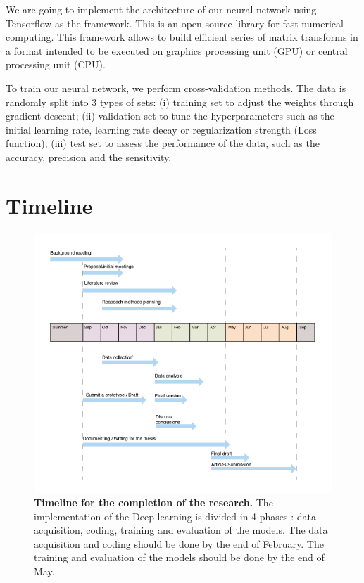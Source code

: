 \documentclass[12pt]{article}
\begin{document}
We are going to implement the architecture of our neural network using Tensorflow\autocite{abadi2016} as the framework. This is an open source library for fast numerical computing. This framework allows to build efficient series of matrix transforms in a format intended to be executed on graphics processing unit (GPU) or central processing unit (CPU). 

To train our neural network, we perform cross-validation methods. The data is randomly split into 3 types of sets: (i) training set to adjust the weights through gradient descent; (ii) validation set to tune the hyperparameters such as the initial learning rate, learning rate decay or regularization strength (Loss function); (iii) test set to assess the performance of the data, such as the accuracy, precision and the sensitivity. 

\section{Timeline}

\begin{figure}[h]
    \centering
    \includegraphics[width=\textwidth]{figure-2.png}
    \caption{ \textbf{Timeline for the completion of the research.} The implementation of the Deep learning is divided in 4 phases : data acquisition, coding, training and evaluation of the models. The data acquisition and coding should be done by the end of February. The training and evaluation of the models should be done by the end of May.}
    \label{fig:plan}
\end{figure}
\end{document}
